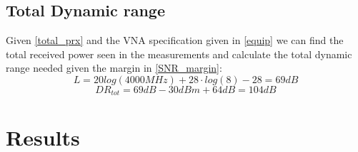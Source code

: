 \subsection{Total Dynamic range}
Given \autoref{total_prx} and the VNA specification given in \autoref{equip} we can find the total received power seen in the measurements and calculate the total dynamic range needed given the margin in \autoref{SNR_margin}:
\begin{equation}
L = 20log (4000MHz) + 28 \cdot log(8)-28 = 69dB
\end{equation}
\begin{equation}
DR_{tot} = 69dB - 30dBm + 64dB = 104dB 
\end{equation}
\section{Results}